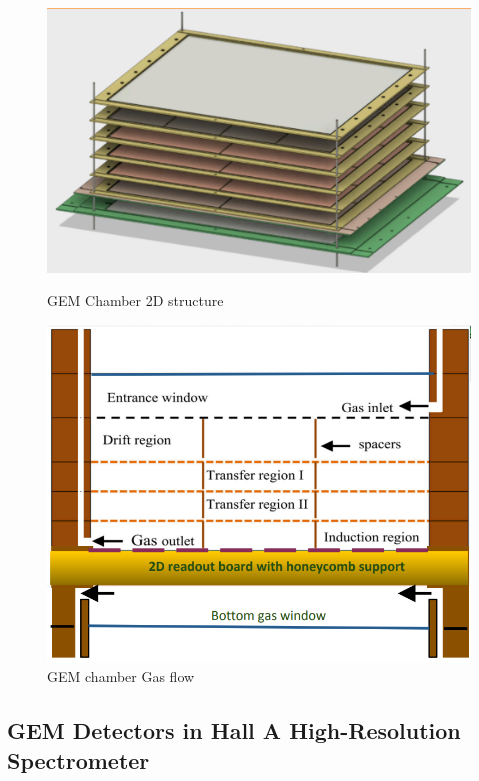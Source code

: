 \begin{figure}[!tbp]
  \centering
  \begin{minipage}[b]{0.45\textwidth}
    \includegraphics[width=\textwidth]{images/chap5/gem_structure_3d.png}
    \caption{GEM Chamber 2D structure}
  \end{minipage}
  \hfill
  \begin{minipage}[b]{0.45\textwidth}
    \includegraphics[width=\textwidth]{images/chap5/gem_structure_chamber_2d.png}
    \caption{GEM chamber Gas flow}
  \end{minipage}
\end{figure}


\subsection{GEM Detectors in Hall A High-Resolution Spectrometer}

